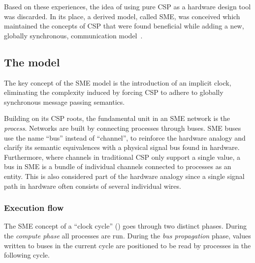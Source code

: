 Based on these experiences, the idea of using pure CSP as a hardware design tool
was discarded. In its place, a derived model, called SME, was conceived which
maintained the concepts of CSP that were found beneficial while adding a new,
globally synchronous, communication model~\cite{vinter2014synchronous}.

\subsection{The model}
The key concept of the SME model is the introduction of an implicit clock,
eliminating the complexity induced by forcing CSP to adhere to globally
synchronous message passing semantics.



Building on its CSP roots, the fundamental unit in an SME network is the
{\itshape process}.  Networks are built by connecting processes through buses.
SME buses use the name ``bus'' instead of ``channel'', to reinforce the hardware
analogy and clarify its semantic equivalences with a physical signal bus found
in hardware. Furthermore, where channels in traditional CSP only support a
single value, a bus in SME is a bundle of individual channels connected to
processes as an entity.  This is also considered part of the hardware analogy
since a single signal path in hardware often consists of several individual
wires.

\subsubsection{Execution flow}
The SME concept of a ``clock cycle'' () goes through two
distinct phases. During the {\itshape compute phase} all processes are
run. During the {\itshape bus propagation} phase, values written to buses in the
current cycle are positioned to be read by processes in the following cycle.

